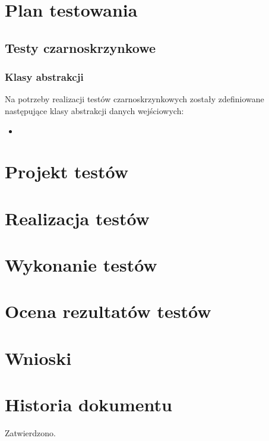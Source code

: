 \documentclass[10pt]{dokument-tiwo}
\begin{document}
\MakeDokumentMeta


\section{Plan testowania}
  \subsection{Testy czarnoskrzynkowe}
    \subsubsection{Klasy abstrakcji}
    Na potrzeby realizacji testów czarnoskrzynkowych zostały zdefiniowane\\następujące klasy abstrakcji danych wejściowych:
    \begin{itemize}
    \item
    \end{itemize}

\section{Projekt testów}


\section{Realizacja testów}


\section{Wykonanie testów}


\section{Ocena rezultatów testów}


\section{Wnioski}


\newpage
\section*{Historia dokumentu}
\begin{versions}
        Zatwierdzono.
\end{versions}
\end{document}
